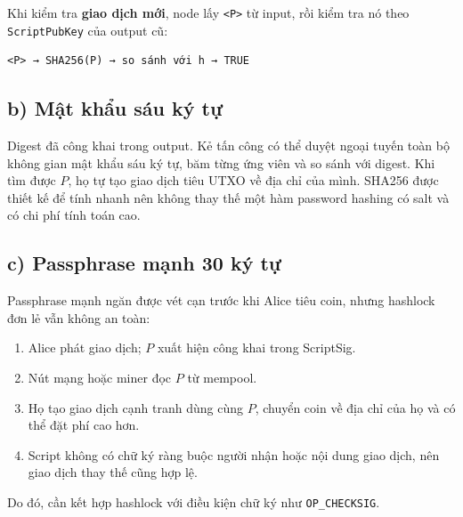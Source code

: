Khi kiểm tra \textbf{giao dịch mới}, node lấy \texttt{<P>} từ input, rồi kiểm
tra nó theo \texttt{ScriptPubKey} của output cũ:

\begin{verbatim}
<P> → SHA256(P) → so sánh với h → TRUE
\end{verbatim}

\subsection*{b) Mật khẩu sáu ký tự}

Digest đã công khai trong output. Kẻ tấn công có thể duyệt ngoại tuyến toàn bộ
không gian mật khẩu sáu ký tự, băm từng ứng viên và so sánh với digest. Khi tìm
được $P$, họ tự tạo giao dịch tiêu UTXO về địa chỉ của mình. SHA256 được thiết
kế để tính nhanh nên không thay thế một hàm password hashing có salt và có chi
phí tính toán cao.

\subsection*{c) Passphrase mạnh 30 ký tự}

Passphrase mạnh ngăn được vét cạn trước khi Alice tiêu coin, nhưng hashlock đơn
lẻ vẫn không an toàn:
\begin{enumerate}[nosep]
  \item Alice phát giao dịch; $P$ xuất hiện công khai trong ScriptSig.
  \item Nút mạng hoặc miner đọc $P$ từ mempool.
  \item Họ tạo giao dịch cạnh tranh dùng cùng $P$, chuyển coin về địa chỉ của
        họ và có thể đặt phí cao hơn.
  \item Script không có chữ ký ràng buộc người nhận hoặc nội dung giao dịch,
        nên giao dịch thay thế cũng hợp lệ.
\end{enumerate}
Do đó, cần kết hợp hashlock với điều kiện chữ ký như \texttt{OP\_CHECKSIG}.
